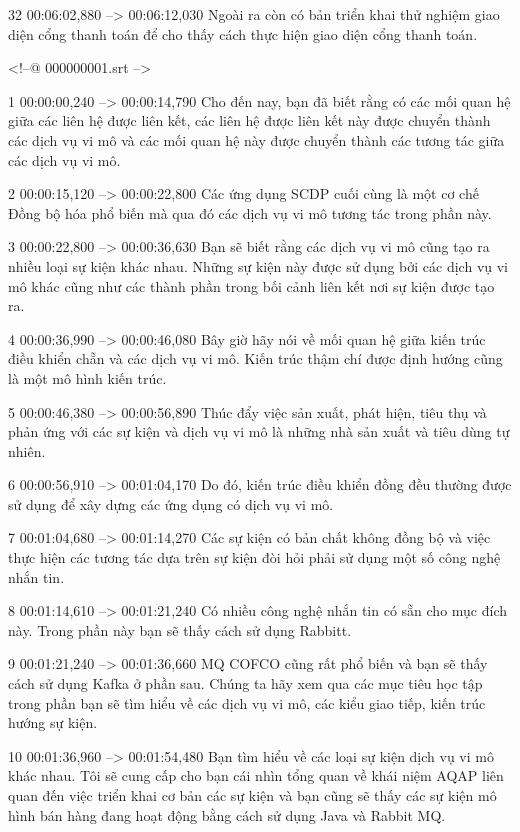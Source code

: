 32
00:06:02,880 --> 00:06:12,030
Ngoài ra còn có bản triển khai thử nghiệm giao diện cổng thanh toán để cho thấy cách thực hiện giao diện cổng thanh toán.

<!--@ 000000001.srt -->

1
00:00:00,240 --> 00:00:14,790
Cho đến nay, bạn đã biết rằng có các mối quan hệ giữa các liên hệ được liên kết, các liên hệ được liên kết này được chuyển thành các dịch vụ vi mô và các mối quan hệ này được chuyển thành các tương tác giữa các dịch vụ vi mô.

2
00:00:15,120 --> 00:00:22,800
Các ứng dụng SCDP cuối cùng là một cơ chế Đồng bộ hóa phổ biến mà qua đó các dịch vụ vi mô tương tác trong phần này.

3
00:00:22,800 --> 00:00:36,630
Bạn sẽ biết rằng các dịch vụ vi mô cũng tạo ra nhiều loại sự kiện khác nhau.  Những sự kiện này được sử dụng bởi các dịch vụ vi mô khác cũng như các thành phần trong bối cảnh liên kết nơi sự kiện được tạo ra.

4
00:00:36,990 --> 00:00:46,080
Bây giờ hãy nói về mối quan hệ giữa kiến ​​trúc điều khiển chẵn và các dịch vụ vi mô.  Kiến trúc thậm chí được định hướng cũng là một mô hình kiến ​​trúc.

5
00:00:46,380 --> 00:00:56,890
Thúc đẩy việc sản xuất, phát hiện, tiêu thụ và phản ứng với các sự kiện và dịch vụ vi mô là những nhà sản xuất và tiêu dùng tự nhiên.

6
00:00:56,910 --> 00:01:04,170
Do đó, kiến ​​trúc điều khiển đồng đều thường được sử dụng để xây dựng các ứng dụng có dịch vụ vi mô.

7
00:01:04,680 --> 00:01:14,270
Các sự kiện có bản chất không đồng bộ và việc thực hiện các tương tác dựa trên sự kiện đòi hỏi phải sử dụng một số công nghệ nhắn tin.

8
00:01:14,610 --> 00:01:21,240
Có nhiều công nghệ nhắn tin có sẵn cho mục đích này.  Trong phần này bạn sẽ thấy cách sử dụng Rabbitt.

9
00:01:21,240 --> 00:01:36,660
MQ COFCO cũng rất phổ biến và bạn sẽ thấy cách sử dụng Kafka ở phần sau.  Chúng ta hãy xem qua các mục tiêu học tập trong phần bạn sẽ tìm hiểu về các dịch vụ vi mô, các kiểu giao tiếp, kiến ​​trúc hướng sự kiện.

10
00:01:36,960 --> 00:01:54,480
Bạn tìm hiểu về các loại sự kiện dịch vụ vi mô khác nhau.  Tôi sẽ cung cấp cho bạn cái nhìn tổng quan về khái niệm AQAP liên quan đến việc triển khai cơ bản các sự kiện và bạn cũng sẽ thấy các sự kiện mô hình bán hàng đang hoạt động bằng cách sử dụng Java và Rabbit MQ.

